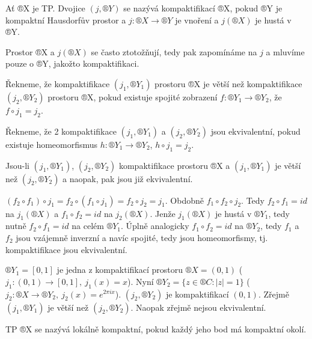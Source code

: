 \documentclass[12pt]{article}					%
\begin{document}
    \begin{definice}[Kompaktifikace]
        Ať ®X je TP. Dvojice $(j, ®Y)$ se nazývá kompaktifikací ®X, pokud ®Y je kompaktní Hausdorfův prostor a $j: ®X \rightarrow ®Y$ je vnoření a $j(®X)$ je hustá v ®Y.

        Prostor ®X a $j(®X)$ se často ztotožňují, tedy pak zapomínáme na $j$ a mluvíme pouze o ®Y, jakožto kompaktifikaci.

        Řekneme, že kompaktifikace $(j_1, ®Y_1)$ prostoru ®X je větší než kompaktifikace $(j_2, ®Y_2)$ prostoru ®X, pokud existuje spojité zobrazení $f: ®Y_1 \rightarrow ®Y_2$, že $f\circ j_1 = j_2$.

        Řekneme, že 2 kompaktifikace $(j_1, ®Y_1)$ a $(j_2, ®Y_2)$ jsou ekvivalentní, pokud existuje homeomorfismus $h: ®Y_1 \rightarrow ®Y_2$, $h \circ j_1 = j_2$.
    \end{definice}

    \begin{poznamka}
        Jsou-li $(j_1, ®Y_1)$, $(j_2, ®Y_2)$ kompaktifikace prostoru ®X a $(j_1, ®Y_1)$ je větší než $(j_2, ®Y_2)$ a naopak, pak jsou již ekvivalentní.
        \begin{dukazin}
            $(f_2 \circ f_1)\circ j_1 = f_2 \circ (f_1  \circ j_1) = f_2 \circ j_2 = j_1$. Obdobně $f_1 \circ f_2 \circ j_2$. Tedy $f_2 \circ f_1 = id$ na $j_1(®X)$ a $f_1 \circ f_2 = id$ na $j_2(®X)$. Jenže $j_1(®X)$ je hustá v $®Y_1$, tedy nutně $f_2 \circ f_1 = id$ na celém $®Y_1$. Úplně analogicky $f_1 \circ f_2 = id$ na $®Y_2$, tedy $f_1$ a $f_2$ jsou vzájemně inverzní a navíc spojité, tedy jsou homeomorfismy, tj. kompaktifikace jsou ekvivalentní.
        \end{dukazin}
    \end{poznamka}

    \begin{priklady}
        $®Y_1 = [0, 1]$ je jedna z kompaktifikací prostoru $®X = (0, 1)$ ($j_1: (0, 1) \rightarrow [0, 1],\ j_1(x) = x$). Nyní $®Y_2 = \{z \in ®C: |z| = 1\}$ ($j_2: ®X \rightarrow ®Y_2,\ j_2(x) = e^{2 \pi i x}$). $(j_2, ®Y_2)$ je kompaktifikací $(0, 1)$. Zřejmě $(j_1, ®Y_1)$ je větší než $(j_2, ®Y_2)$. Naopak zřejmě nejsou ekvivalentní.
    \end{priklady}

    \begin{definice}
        TP ®X se nazývá lokálně kompaktní, pokud každý jeho bod má kompaktní okolí.
    \end{definice}
\end{document}
